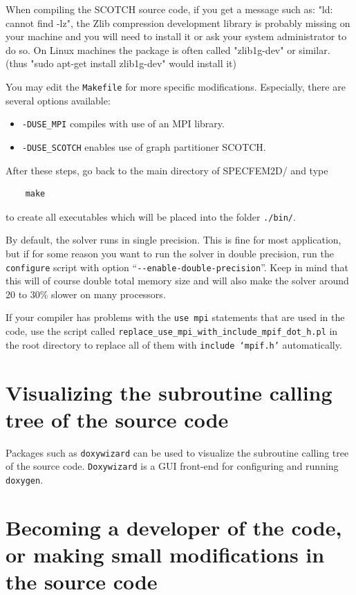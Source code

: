 \documentclass[oneside,english,onecolumn,letterpaper]{book}
\begin{document}
When compiling the SCOTCH source code, if you get a message such as: "ld: cannot find -lz",
the Zlib compression development library is probably missing on your machine and you will need to install it or ask your system administrator to
do so. On Linux machines the package is often called "zlib1g-dev" or similar. (thus "sudo apt-get install zlib1g-dev" would install it)

You may edit the \texttt{Makefile} for more specific modifications. Especially, there are several options available:
%
\begin{itemize}
\item \texttt{-DUSE\_MPI} compiles with use of an MPI library.
\item \texttt{-DUSE\_SCOTCH} enables use of graph partitioner SCOTCH.
\end{itemize}
%
After these steps, go back to the main directory of SPECFEM2D/ and type
%
\begin{verbatim}
    make
\end{verbatim}
%
to create all executables which will be placed into the folder \texttt{./bin/}.

By default, the solver runs in single precision. This is fine for most application, but if for some reason
you want to run the solver in double precision, run the \texttt{configure} script with option ``\texttt{-{}-enable-double-precision}''.
Keep in mind that this will of course double total memory size and will also make the solver around 20 to 30\% slower
on many processors.

If your compiler has problems with the \texttt{use mpi} statements that are used in the code, use the script called
\texttt{replace\_use\_mpi\_with\_include\_mpif\_dot\_h.pl} in the root directory to replace all of them with \texttt{include `mpif.h'} automatically.

\section{Visualizing the subroutine calling tree of the source code}

Packages such as \texttt{doxywizard} can be used to visualize the subroutine calling tree of the source code.
\texttt{Doxywizard} is a GUI front-end for configuring and running \texttt{doxygen}.

\section{Becoming a developer of the code, or making small modifications in the source code}
\end{document}
